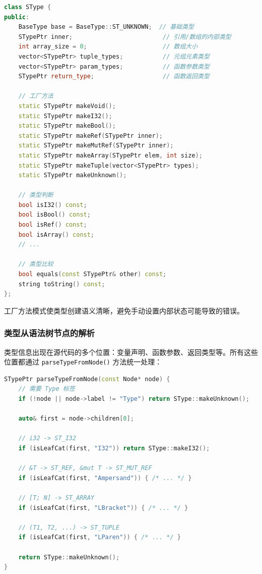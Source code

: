 \documentclass[12pt,a4paper]{ctexart}
\begin{document}
\begin{lstlisting}[language=C++, caption={SType类定义}]
class SType {
public:
    BaseType base = BaseType::ST_UNKNOWN;  // 基础类型
    STypePtr inner;                         // 引用/数组的内部类型
    int array_size = 0;                     // 数组大小
    vector<STypePtr> tuple_types;           // 元组元素类型
    vector<STypePtr> param_types;           // 函数参数类型
    STypePtr return_type;                   // 函数返回类型

    // 工厂方法
    static STypePtr makeVoid();
    static STypePtr makeI32();
    static STypePtr makeBool();
    static STypePtr makeRef(STypePtr inner);
    static STypePtr makeMutRef(STypePtr inner);
    static STypePtr makeArray(STypePtr elem, int size);
    static STypePtr makeTuple(vector<STypePtr> types);
    static STypePtr makeUnknown();

    // 类型判断
    bool isI32() const;
    bool isBool() const;
    bool isRef() const;
    bool isArray() const;
    // ...

    // 类型比较
    bool equals(const STypePtr& other) const;
    string toString() const;
};
\end{lstlisting}

工厂方法模式使类型创建语义清晰，避免手动设置内部状态可能导致的错误。

\subsubsection{类型从语法树节点的解析}

类型信息出现在源代码的多个位置：变量声明、函数参数、返回类型等。所有这些位置都通过 \texttt{parseTypeFromNode()} 方法统一处理：

\begin{lstlisting}[language=C++, caption={类型解析逻辑}]
STypePtr parseTypeFromNode(const Node* node) {
    // 需要 Type 标签
    if (!node || node->label != "Type") return SType::makeUnknown();

    auto& first = node->children[0];

    // i32 -> ST_I32
    if (isLeafCat(first, "I32")) return SType::makeI32();

    // &T -> ST_REF, &mut T -> ST_MUT_REF
    if (isLeafCat(first, "Ampersand")) { /* ... */ }

    // [T; N] -> ST_ARRAY
    if (isLeafCat(first, "LBracket")) { /* ... */ }

    // (T1, T2, ...) -> ST_TUPLE
    if (isLeafCat(first, "LParen")) { /* ... */ }

    return SType::makeUnknown();
}
\end{lstlisting}
\end{document}
